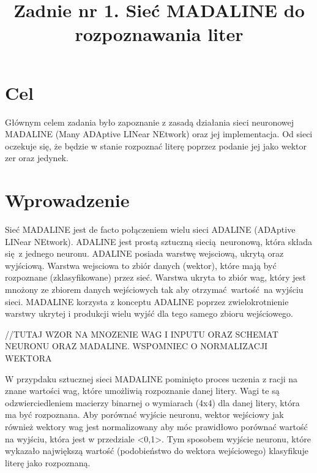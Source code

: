\documentclass{classrep}
\author{
  \studentinfo{Szymon Łyszkowski}{206809}\and
  \studentinfo{Piotr Kluch}{206799}
}
\title{Zadnie nr 1. Sieć MADALINE do rozpoznawania liter}
\begin{document}
\maketitle

\section{Cel}
{
Głównym celem zadania było zapoznanie z zasadą działania sieci neuronowej MADALINE (Many ADAptive LINear NEtwork) oraz jej implementacja. Od sieci oczekuje się, że będzie w stanie rozpoznać literę poprzez podanie jej jako wektor zer oraz jedynek.}

\section{Wprowadzenie}
{Sieć MADALINE jest de facto połączeniem wielu sieci ADALINE (ADAptive LINear NEtwork). ADALINE jest prostą sztuczną siecią neuronową, która składa się z jednego neuronu. ADALINE posiada warstwę wejsciową, ukrytą oraz wyjściową. Warstwa wejsciowa to zbiór danych (wektor), które mają być rozpoznane (zklasyfikowane) przez sieć. Warstwa ukryta to zbiór wag, który jest mnożony ze zbiorem danych wejściowych tak aby otrzymać wartość na wyjściu sieci. MADALINE korzysta z konceptu ADALINE poprzez zwielokrotnienie warstwy ukrytej i produkcji wielu wyjść dla tego samego zbioru wejściowego.

//TUTAJ WZOR NA MNOZENIE WAG I INPUTU ORAZ SCHEMAT NEURONU ORAZ MADALINE. WSPOMNIEC O NORMALIZACJI WEKTORA

W przypdaku sztucznej sieci MADALINE pominięto proces uczenia z racji na znane wartości wag, które umożliwią rozpoznanie danej litery. Wagi te są odzwierciedleniem macierzy binarnej o wymiarach (4x4) dla danej litery, która ma być rozpoznana. Aby porównać wyjście neuronu, wektor wejściowy jak również wektory wag jest normalizowany aby móc prawidłowo porównać wartość na wyjściu, która jest w przedziale <0,1>. Tym sposobem wyjście neuronu, które wykazało największą wartość (podobieństwo do wektora wejściowego) klasyfikuje literę jako rozpoznaną.
}
\end{document}
